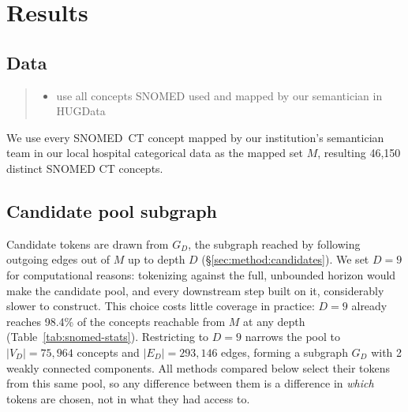 \section{Results}
\label{sec:results}


\subsection{Data}
\label{sec:results:data}

\begin{quote}\small\itshape
\begin{itemize}
\item use all concepts SNOMED used and mapped by our semantician in HUGData
\end{itemize}
\end{quote}

We use every SNOMED~CT concept mapped by our institution's semantician team
in our local hospital categorical data  as the mapped set $M$, resulting 46,150 distinct SNOMED CT concepts.

\subsection{Candidate pool subgraph}
\label{sec:results:candidates}

Candidate tokens are drawn from $G_D$, the subgraph reached by
following outgoing edges out of $M$ up to depth $D$
(\S\ref{sec:method:candidates}). We set $D = 9$ for computational
reasons: tokenizing against the full, unbounded horizon would make
the candidate pool, and every downstream step built on it,
considerably slower to construct. This choice costs little coverage
in practice: $D=9$ already reaches 98.4\% of the concepts reachable
from $M$ at any depth (Table~\ref{tab:snomed-stats}). Restricting to
$D=9$ narrows the pool to $|V_D| = 75{,}964$ concepts and $|E_D| =
293{,}146$ edges, forming a subgraph $G_D$ with 2 weakly connected
components. All methods compared below select their tokens from
this same pool, so any difference between them is a difference in
\emph{which} tokens are chosen, not in what they had access to.

